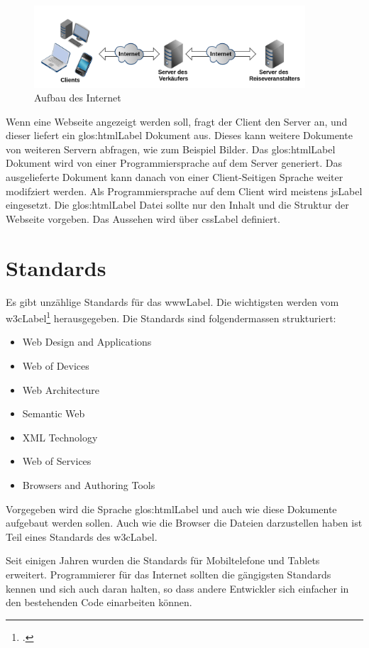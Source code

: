 \begin{figure}[H]
  \centering
  \includegraphics[width=0.9\textwidth]{images/aufbau-internet.png}
  \caption{Aufbau des Internet}
  \label{fig:einfuehrung:aufbau-des-internets}
\end{figure}

Wenn eine Webseite angezeigt werden soll, fragt der Client den Server an, und dieser liefert ein \Gls{glos:htmlLabel} Dokument aus. Dieses kann weitere Dokumente von weiteren Servern abfragen, wie zum Beispiel Bilder.
Das \Gls{glos:htmlLabel} Dokument wird von einer Programmiersprache auf dem Server generiert. Das ausgelieferte Dokument kann danach von einer Client-Seitigen Sprache weiter modifziert werden. Als Programmiersprache auf dem Client wird meistens \gls{jsLabel} eingesetzt. Die \Gls{glos:htmlLabel} Datei sollte nur den Inhalt und die Struktur der Webseite vorgeben. Das Aussehen wird über \gls{cssLabel} definiert.



\section{Standards}
Es gibt unzählige Standards für das \gls{wwwLabel}. Die wichtigsten werden vom \gls{w3cLabel}\footcite{World_Wide_Web_Consortium_2015-05-30} herausgegeben.
Die Standards sind folgendermassen strukturiert:
\begin{itemize}
\item Web Design and Applications
\item Web of Devices
\item Web Architecture
\item Semantic Web
\item XML Technology
\item Web of Services
\item Browsers and Authoring Tools
\end{itemize}
Vorgegeben wird die Sprache \Gls{glos:htmlLabel} und auch wie diese Dokumente aufgebaut werden sollen. Auch wie die Browser die Dateien darzustellen haben ist Teil eines Standards des \gls{w3cLabel}.

Seit einigen Jahren wurden die Standards für Mobiltelefone und Tablets erweitert. Programmierer für das Internet sollten die gängigsten Standards kennen und sich auch daran halten, so dass andere Entwickler sich einfacher in den bestehenden Code einarbeiten können.
